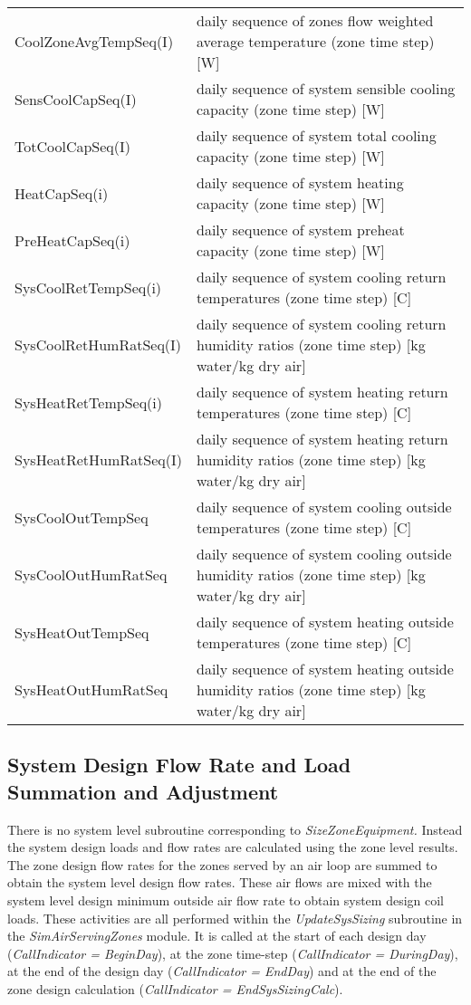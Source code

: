 \begin{longtable}[c]{p{1.5in}p{4.5in}}
CoolZoneAvgTempSeq(I) & daily sequence of zones flow weighted average temperature (zone time step) [W] \tabularnewline
SensCoolCapSeq(I) & daily sequence of system sensible cooling capacity (zone time step) [W] \tabularnewline
TotCoolCapSeq(I) & daily sequence of system total cooling capacity (zone time step) [W] \tabularnewline
HeatCapSeq(i) & daily sequence of system heating capacity (zone time step) [W] \tabularnewline
PreHeatCapSeq(i) & daily sequence of system preheat capacity (zone time step) [W] \tabularnewline
SysCoolRetTempSeq(i) & daily sequence of system cooling return temperatures (zone time step) [C] \tabularnewline
SysCoolRetHumRatSeq(I) & daily sequence of system cooling return humidity ratios (zone time step) [kg water/kg dry air] \tabularnewline
SysHeatRetTempSeq(i) & daily sequence of system heating return temperatures (zone time step) [C] \tabularnewline
SysHeatRetHumRatSeq(I) & daily sequence of system heating return humidity ratios (zone time step) [kg water/kg dry air] \tabularnewline
SysCoolOutTempSeq & daily sequence of system cooling outside temperatures (zone time step) [C] \tabularnewline
SysCoolOutHumRatSeq & daily sequence of system cooling outside humidity ratios (zone time step) [kg water/kg dry air] \tabularnewline
SysHeatOutTempSeq & daily sequence of system heating outside temperatures (zone time step) [C] \tabularnewline
SysHeatOutHumRatSeq & daily sequence of system heating outside humidity ratios (zone time step) [kg water/kg dry air] \tabularnewline
\bottomrule
\end{longtable}

\subsection{System Design Flow Rate and Load Summation and Adjustment}\label{system-design-flow-rate-and-load-summation-and-adjustment}

There is no system level subroutine corresponding to \emph{SizeZoneEquipment.} Instead the system design loads and flow rates are calculated using the zone level results. The zone design flow rates for the zones served by an air loop are summed to obtain the system level design flow rates. These air flows are mixed with the system level design minimum outside air flow rate to obtain system design coil loads. These activities are all performed within the \emph{UpdateSysSizing} subroutine in the \emph{SimAirServingZones} module. It is called at the start of each design day (\emph{CallIndicator = BeginDay}), at the zone time-step (\emph{CallIndicator = DuringDay}), at the end of the design day (\emph{CallIndicator = EndDay}) and at the end of the zone design calculation (\emph{CallIndicator = EndSysSizingCalc}).

